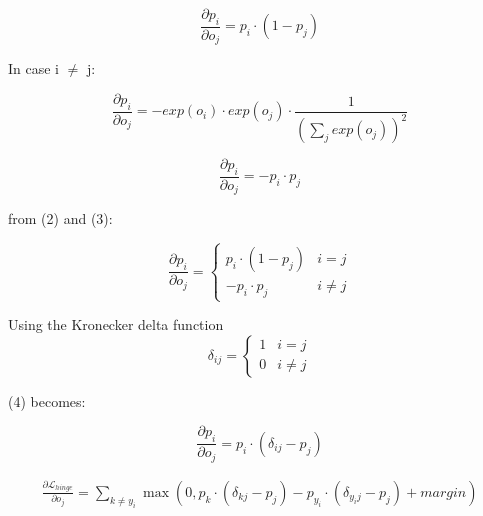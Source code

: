 \documentclass[a4paper]{article}
\begin{document}
\begin{equation}
\frac{\partial p_i}{\partial o_j} = p_i \cdot (1 - p_j)
\end{equation}

In case i $\neq$ j:

\begin{equation}
\frac{\partial p_i}{\partial o_j} = - exp(o_i)\cdot exp(o_j) \cdot \frac{1}{{(\sum \limits_{j} exp(o_j))}^2}
\nonumber\end{equation}

\begin{equation}
\frac{\partial p_i}{\partial o_j} = -p_i \cdot p_j
\end{equation}
 
from (2) and (3):

\begin{equation}
\frac{\partial p_i}{\partial o_j} = \left\{ \begin{array}{ll}
    p_i \cdot (1 - p_j) & i=j \\
    -p_i \cdot p_j & i \neq j
    \end{array}
    \right.
\end{equation}

Using the Kronecker delta function \begin{equation}
\delta_{ij} = \left\{ \begin{array}{ll}
    1 & i=j \\
    0 & i \neq j
    \end{array}
    \right.
\nonumber\end{equation}

(4) becomes:

\begin{equation}
\frac{\partial p_i}{\partial o_j} = p_i \cdot (\delta_{ij} - p_j)
\end{equation}

\begin{gather} \frac {\partial \mathcal{L}_{hinge}}{\partial o_j} = \sum \limits_{k \neq y_i} \max (0,   p_k \cdot (\delta_{kj} - p_j) - p_{y_i} \cdot (\delta_{{y_i}j} - p_j) + margin)\nonumber \end{gather}
\end{document}
